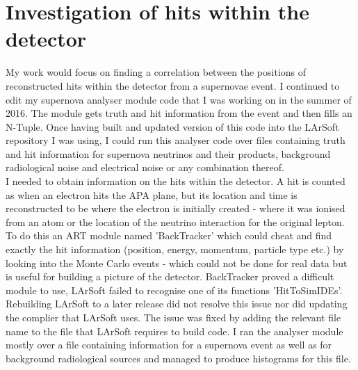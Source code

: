 \documentclass[a4paper,12,oneside,notitlepage]{report}
\begin{document}
\section*{\fontsize{11}{11}\selectfont Investigation of hits within the detector}
My work would focus on finding a correlation between the positions of reconstructed hits within the detector from a supernovae event. I continued to edit my supernova analyser module code that I was working on in the summer of 2016. The module gets truth and hit information from the event and then fills an N-Tuple. Once having built and updated version of this code into the LArSoft repository I was using, I could run this analyser code over files containing truth and hit information for supernova neutrinos and their products, background radiological noise and electrical noise or any combination thereof. 
\vspace{0.5cm}
\\I needed to obtain information on the hits within the detector. A hit is counted as when an electron hits the APA plane, but its location and time is reconstructed to be where the electron is initially created - where it was ionised from an atom or the location of the neutrino interaction for the original lepton. To do this an ART module named 'BackTracker' which could cheat and find exactly the hit information (position, energy, momentum, particle type etc.) by looking into the Monte Carlo events - which could not be done for real data but is useful for building a picture of the detector. BackTracker proved a difficult module to use, LArSoft failed to recognise one of its functions 'HitToSimIDEs'. Rebuilding LArSoft to a later release did not resolve this issue nor did updating the complier that LArSoft uses. The issue was fixed by adding the relevant file name to the file that LArSoft requires to build code. I ran the analyser module mostly over a file containing information for a supernova event as well as for background radiological sources and managed to produce histograms for this file. 
\vspace{0.5cm}
\end{document}
